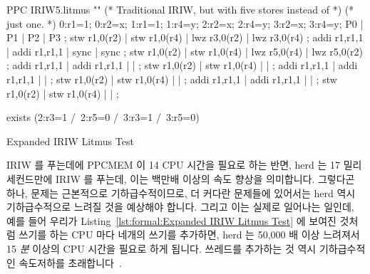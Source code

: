 \begin{listing}[tb]
\begin{linelabel}
\begin{VerbatimL}[commandchars=\%\@\$]
PPC IRIW5.litmus
""
(* Traditional IRIW, but with five stores instead of *)
(* just one.                                         *)
{
0:r1=1; 0:r2=x;
1:r1=1;         1:r4=y;
        2:r2=x; 2:r4=y;
        3:r2=x; 3:r4=y;
}
P0           | P1           | P2           | P3           ;
stw r1,0(r2) | stw r1,0(r4) | lwz r3,0(r2) | lwz r3,0(r4) ;
addi r1,r1,1 | addi r1,r1,1 | sync         | sync         ;
stw r1,0(r2) | stw r1,0(r4) | lwz r5,0(r4) | lwz r5,0(r2) ;
addi r1,r1,1 | addi r1,r1,1 |              |              ;
stw r1,0(r2) | stw r1,0(r4) |              |              ;
addi r1,r1,1 | addi r1,r1,1 |              |              ;
stw r1,0(r2) | stw r1,0(r4) |              |              ;
addi r1,r1,1 | addi r1,r1,1 |              |              ;
stw r1,0(r2) | stw r1,0(r4) |              |              ;

exists
(2:r3=1 /\ 2:r5=0 /\ 3:r3=1 /\ 3:r5=0)
\end{VerbatimL}
\end{linelabel}
\caption{Expanded IRIW Litmus Test}
\label{lst:formal:Expanded IRIW Litmus Test}
\end{listing}

IRIW 를 푸는데에 PPCMEM 이 14 CPU 시간을 필요로 하는 반면, herd 는 17
밀리세컨드만에 IRIW 를 푸는데, 이는 백만배 이상의 속도 향상을 의미합니다.
그렇다곤 하나, 문제는 근본적으로 기하급수적이므로, 더 커다란 문제들에 있어서는
herd 역시 기하급수적으로 느려질 것을 예상해야 합니다.
그리고 이는 실제로 일어나는 일인데, 예를 들어 우리가
Listing~\ref{lst:formal:Expanded IRIW Litmus Test} 에 보여진 것처럼 쓰기를 하는
CPU 마다 네개의 쓰기를 추가하면, herd 는 50,000 배 이상 느려져서 15 \emph{분}
이상의 CPU 시간을 필요로 하게 됩니다.
쓰레드를 추가하는 것 역시 기하급수적인 속도저하를
초래합니다~\cite{PaulEMcKenney2014weakaxiom}.
\iffalse

However, where PPCMEM requires 14 CPU hours to solve IRIW, herd does so
in 17 milliseconds, which represents a speedup of more than six orders
of magnitude.
That said, the problem is exponential in nature, so we should expect
herd to exhibit exponential slowdowns for larger problems.
And this is exactly what happens, for example, if we add four more writes
per writing CPU as shown in
Listing~\ref{lst:formal:Expanded IRIW Litmus Test},
herd slows down by a factor of more than 50,000, requiring more than
15 \emph{minutes} of CPU time.
Adding threads also results in exponential
slowdowns~\cite{PaulEMcKenney2014weakaxiom}.
\fi

